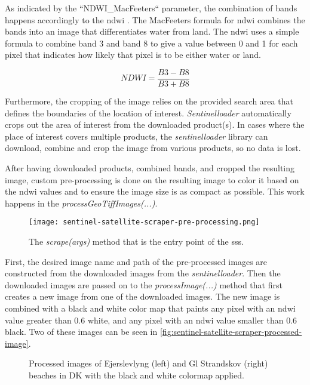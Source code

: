 As indicated by the ``NDWI\_MacFeeters`` parameter, the combination of bands happens accordingly to the \acrfull{ndwi} \cite{ndwi}. The MacFeeters formula for \acrshort{ndwi} combines the bands into an image that differentiates water from land. The \acrshort{ndwi} uses a simple formula to combine band 3 and band 8 to give a value between 0 and 1 for each pixel that indicates how likely that pixel is to be either water or land. \cite{sentinel-2-bands-combinations}

\[ NDWI = \dfrac{B3 - B8}{B3 + B8} \]

Furthermore, the cropping of the image relies on the provided search area that defines the boundaries of the location of interest. \emph{Sentinelloader} automatically crops out the area of interest from the downloaded product(s). In cases where the place of interest covers multiple products, the \emph{sentinelloader} library can download, combine and crop the image from various products, so no data is lost.

After having downloaded products, combined bands, and cropped the resulting image, custom pre-processing is done on the resulting image to color it based on the \acrshort{ndwi} values and to ensure the image size is as compact as possible. This work happens in the \emph{processGeoTiffImages(...)}.

\begin{figure}[h!]
    \centering
    \texttt{[image: sentinel-satellite-scraper-pre-processing.png]}
    \caption{The \emph{scrape(args)} method that is the entry point of the \acrshort{sss}.}
    \label{fig:sentinel-satellite-scraper-pre-processing}
\end{figure}

First, the desired image name and path of the pre-processed images are constructed from the downloaded images from the \emph{sentinelloader}. Then the downloaded images are passed on to the \emph{processImage(...)} method that first creates a new image from one of the downloaded images. The new image is combined with a black and white color map that paints any pixel with an \acrshort{ndwi} value greater than 0.6 white, and any pixel with an \acrshort{ndwi} value smaller than 0.6 black. Two of these images can be seen in \autoref{fig:sentinel-satellite-scraper-processed-image}.

\begin{figure}[h!]
    \centering
    \caption{Processed images of Ejerslevlyng (left) and Gl Strandskov (right) beaches in DK with the black and white colormap applied.}
    \label{fig:sentinel-satellite-scraper-processed-image}
\end{figure}

